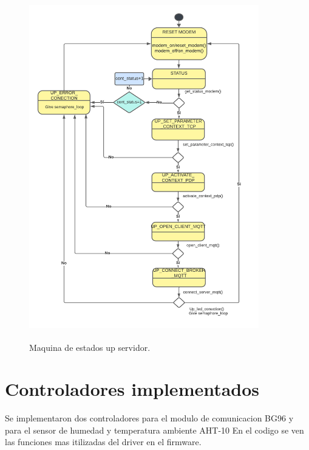 \begin{figure}[h]
  \centering
	\includegraphics[width=10cm, height=15cm]{./Figures/SM up server.png}
	\caption{Maquina de estados up servidor.}
	\label{fig:Maquina de estados up servidor}
\end{figure}

\clearpage
\section{Controladores implementados}
Se implementaron dos controladores para el modulo de comunicacion BG96 y para el sensor de humedad y temperatura ambiente AHT-10
En el codigo se ven las funciones mas itilizadas del driver en el firmware.


